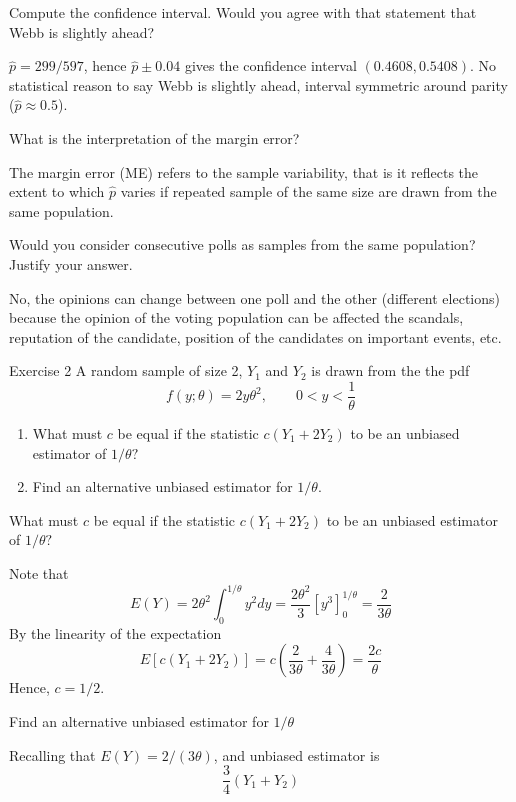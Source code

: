 \documentclass[
  10pt,
  ignorenonframetext,
]{beamer}
\begin{document}
\begin{frame}{Compute the confidence interval. Would you agree with that
statement that Webb is slightly ahead?}
\protect\hypertarget{compute-the-confidence-interval.-would-you-agree-with-that-statement-that-webb-is-slightly-ahead}{}
\pause

\(\hat{p}=299/597\), hence \(\hat{p}\pm 0.04\) gives the confidence
interval \((0.4608, 0.5408)\). No statistical reason to say Webb is
slightly ahead, interval symmetric around parity
(\(\hat{p}\approx 0.5\)).
\end{frame}

\begin{frame}{What is the interpretation of the margin error?}
\protect\hypertarget{what-is-the-interpretation-of-the-margin-error}{}
\pause

The margin error (ME) refers to the sample variability, that is it
reflects the extent to which \(\hat{p}\) varies if repeated sample of
the same size are drawn from the same population.
\end{frame}

\begin{frame}{Would you consider consecutive polls as samples from the
same population? Justify your answer.}
\protect\hypertarget{would-you-consider-consecutive-polls-as-samples-from-the-same-population-justify-your-answer.}{}
\pause

No, the opinions can change between one poll and the other (different
elections) because the opinion of the voting population can be affected
the scandals, reputation of the candidate, position of the candidates on
important events, etc.
\end{frame}

\begin{frame}{Exercise 2}
\protect\hypertarget{exercise-2}{}
A random sample of size 2, \(Y_1\) and \(Y_2\) is drawn from the the pdf
\[
f(y;\theta)=2y\theta^2,\qquad 0<y<\frac{1}{\theta}
\]

\begin{enumerate}
  \item What must $c$ be equal if the statistic 
$c(Y_1+2Y_2)$ to be an unbiased estimator of $1/\theta?$
  \item Find an alternative unbiased estimator for $1/\theta$.
\end{enumerate}
\end{frame}

\begin{frame}{What must \(c\) be equal if the statistic \(c(Y_1+2Y_2)\)
to be an unbiased estimator of \(1/\theta?\)}
\protect\hypertarget{what-must-c-be-equal-if-the-statistic-cy_12y_2-to-be-an-unbiased-estimator-of-1theta}{}
\pause

Note that \[
E(Y)=2\theta^2\int_{0}^{1/\theta}y^2dy=\frac{2\theta^2}{3}\left[y^3\right]_0^{1/\theta}=\frac{2}{3\theta}
\] By the linearity of the expectation \[
E\left[c(Y_1+2Y_2)\right]=c\left(\frac{2}{3\theta}+\frac{4}{3\theta}\right)=\frac{2c}{\theta}
\] Hence, \(c=1/2\).
\end{frame}

\begin{frame}{Find an alternative unbiased estimator for \(1/\theta\)}
\protect\hypertarget{find-an-alternative-unbiased-estimator-for-1theta}{}
\pause

Recalling that \(E(Y)=2/(3\theta)\), and unbiased estimator is \[
\frac{3}{4}\left(Y_1+Y_2\right)
\]
\end{frame}
\end{document}
